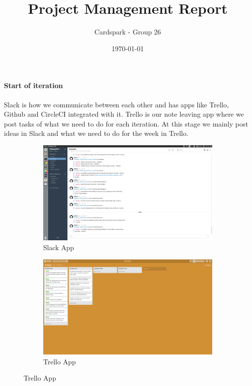 \documentclass[a4wide, 10pt]{article}
\begin{document}
\title{Project Management Report}

\author{Cardspark - Group 26}

\date{\today}         %

\maketitle            %

\paragraph{Start of iteration}
Slack is how we communicate between each other and has apps like Trello, Github and CircleCI integrated with it.  Trello is our note leaving app where we post tasks of what we need to do for each iteration.  At this stage we mainly post ideas in Slack and what we need to do for the week in Trello.
\begin{figure}[h]
\centering
\begin{subfigure}{.5\textwidth}
  \centering
  	\includegraphics[scale=0.1]{slackstart.png} 
  \caption{Slack App}
  \label{fig:sub1}
\end{subfigure}%
\begin{subfigure}{.5\textwidth}
  \centering
  	\includegraphics[scale=0.1]{iterationstart.png} 
  \caption{Trello App}
  \label{fig:sub2}
\end{subfigure}
\label{fig:test}
\end{figure}
\vspace*{-\baselineskip} 
\end{document}
